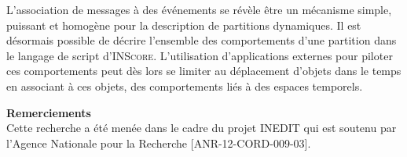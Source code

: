 \documentclass{article}
\newcommand{\inscore}		{\textsc{\small INScore}}
\begin{document}
L'association de messages à des événements se révèle être un mécanisme simple, puissant et homogène pour la description de partitions dynamiques. Il est désormais possible de décrire l'ensemble des comportements d'une partition dans le langage de script d'\inscore . L'utilisation d'applications externes pour piloter ces comportements peut dès lors se limiter au déplacement d'objets dans le temps en associant à ces objets, des comportements liés à des espaces temporels.


\vspace{4mm}
\hspace{-5mm}
\textbf{Remerciements} \\
Cette recherche a été menée dans le cadre du projet \mbox{INEDIT} qui est soutenu par l'Agence Nationale pour la Recherche [ANR-12-CORD-009-03].

%


\end{document}
